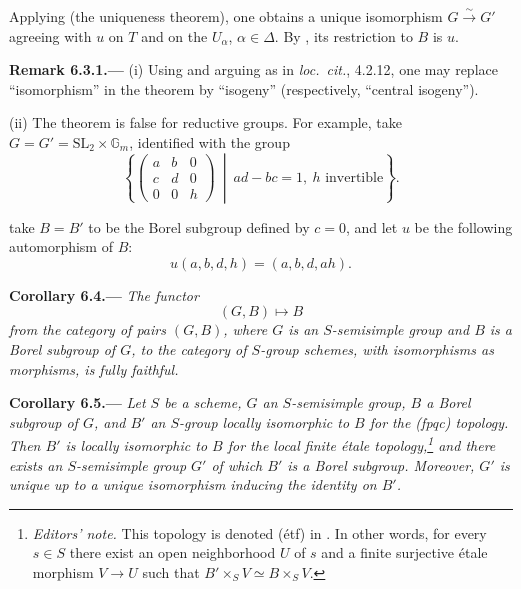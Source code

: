 Applying  (the uniqueness theorem), one obtains a unique
isomorphism \(G\xrightarrow{\sim}G'\) agreeing with \(u\) on \(T\)
and on the \(U_\alpha\), \(\alpha\in\Delta\).  By , its restriction
to \(B\) is \(u\).

\par\medskip\noindent{}\textbf{Remark 6.3.1.---}\enspace
(i) Using  and arguing as in \emph{loc.\ cit.}, 4.2.12,
one may replace ``isomorphism'' in the theorem by ``isogeny''
(respectively, ``central isogeny'').

(ii) The theorem is false for reductive groups.  For example, take
\(G=G'=\mathrm{SL}_2\times\mathbb G_m\), identified with the group
\[
 \left\{
 \begin{pmatrix}
   a&b&0\\
   c&d&0\\
   0&0&h
 \end{pmatrix}
 \ \middle|\ ad-bc=1,\ h\text{ invertible}
 \right\}.
\]



\setcounter{footnote}{29}

take \(B=B'\) to be the Borel subgroup defined by \(c=0\), and let \(u\)
be the following automorphism of \(B\):
\[
  u(a,b,d,h)=(a,b,d,ah).
\]

\par\medskip\noindent{}\textbf{Corollary 6.4.---}\enspace
\emph{The functor
\[
  (G,B)\longmapsto B
\]
from the category of pairs \((G,B)\), where \(G\) is an
\(S\)-semisimple group and \(B\) is a Borel subgroup of \(G\), to the
category of \(S\)-group schemes, with isomorphisms as morphisms, is
fully faithful.}

\par\medskip\noindent{}\textbf{Corollary 6.5.---}\enspace
\emph{Let \(S\) be a scheme, \(G\) an \(S\)-semisimple group, \(B\) a
Borel subgroup of \(G\), and \(B'\) an \(S\)-group locally isomorphic to
\(B\) for the \textup{(fpqc)} topology. Then \(B'\) is locally
isomorphic to \(B\) for the local finite étale
topology,\footnote{\textit{Editors' note.} This topology is denoted
\textup{(étf)} in . In other words, for every \(s\in S\)
there exist an open neighborhood \(U\) of \(s\) and a finite surjective
étale morphism \(V\to U\) such that
\(B'\times_S V\simeq B\times_S V\).} and there exists an
\(S\)-semisimple group \(G'\) of which \(B'\) is a Borel subgroup.
Moreover, \(G'\) is unique up to a unique isomorphism inducing the
identity on \(B'\).}

